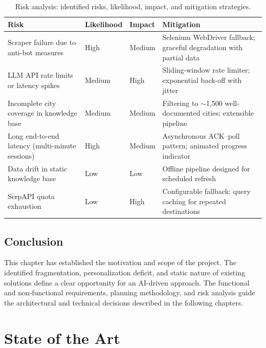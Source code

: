 \documentclass[12pt,a4paper]{report}
\begin{document}
\begin{table}[htbp]
\centering
\small
\renewcommand{\arraystretch}{1.3}
\begin{tabularx}{\textwidth}{
    >{\raggedright\arraybackslash}p{3.8cm}
    >{\centering\arraybackslash}p{1.6cm}
    >{\centering\arraybackslash}p{1.6cm}
    >{\raggedright\arraybackslash}X}
\toprule
\textbf{Risk} & \textbf{Likelihood} & \textbf{Impact} & \textbf{Mitigation} \\
\midrule
Scraper failure due to anti-bot measures
  & High & Medium
  & Selenium WebDriver fallback; graceful degradation with partial data \\
LLM API rate limits or latency spikes
  & Medium & High
  & Sliding-window rate limiter; exponential back-off with jitter \\
Incomplete city coverage in knowledge base
  & Medium & Medium
  & Filtering to $\sim$1{,}500 well-documented cities; extensible pipeline \\
Long end-to-end latency (multi-minute sessions)
  & High & Medium
  & Asynchronous ACK--poll pattern; animated progress indicator \\
Data drift in static knowledge base
  & Low & Low
  & Offline pipeline designed for scheduled refresh \\
SerpAPI quota exhaustion
  & Low & High
  & Configurable fallback; query caching for repeated destinations \\
\bottomrule
\end{tabularx}
\caption{Risk analysis: identified risks, likelihood, impact, and mitigation strategies.}
\label{tab:risk-analysis}
\end{table}

\section*{Conclusion}

This chapter has established the motivation and scope of the project. The identified fragmentation,
personalization deficit, and static nature of existing solutions define a clear opportunity for an
AI-driven approach. The functional and non-functional requirements, planning methodology, and risk
analysis guide the architectural and technical decisions described in the following chapters.

\chapter{State of the Art}
\end{document}
